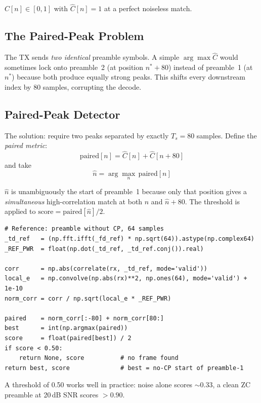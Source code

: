 \documentclass[11pt,a4paper]{article}
\begin{document}
$\hat{C}[n] \in [0,1]$ with $\hat{C}[n]=1$ at a perfect noiseless match.

\subsection{The Paired-Peak Problem}

The TX sends \emph{two identical} preamble symbols.  A simple $\arg\max
\hat{C}$ would sometimes lock onto preamble~2 (at position
$n^* + 80$) instead of preamble~1 (at $n^*$) because both produce equally
strong peaks.  This shifts every downstream index by 80 samples, corrupting
the decode.

\subsection{Paired-Peak Detector}

The solution: require two peaks separated by exactly $T_s = 80$ samples.
Define the \emph{paired metric}:
\begin{equation}
  \text{paired}[n] = \hat{C}[n] + \hat{C}[n + 80]
\end{equation}
and take
\begin{equation}
  \hat{n} = \arg\max_n\, \text{paired}[n]
\end{equation}

$\hat{n}$ is unambiguously the start of preamble~1 because only that position
gives a \emph{simultaneous} high-correlation match at both $\hat{n}$ and
$\hat{n}+80$.  The threshold is applied to
$\text{score} = \text{paired}[\hat{n}]/2$.

\begin{lstlisting}
# Reference: preamble without CP, 64 samples
_td_ref   = (np.fft.ifft(_fd_ref) * np.sqrt(64)).astype(np.complex64)
_REF_PWR  = float(np.dot(_td_ref, _td_ref.conj()).real)

corr      = np.abs(correlate(rx, _td_ref, mode='valid'))
local_e   = np.convolve(np.abs(rx)**2, np.ones(64), mode='valid') + 1e-10
norm_corr = corr / np.sqrt(local_e * _REF_PWR)

paired    = norm_corr[:-80] + norm_corr[80:]
best      = int(np.argmax(paired))
score     = float(paired[best]) / 2
if score < 0.50:
    return None, score          # no frame found
return best, score              # best = no-CP start of preamble-1
\end{lstlisting}

A threshold of 0.50 works well in practice: noise alone scores $\sim0.33$,
a clean ZC preamble at 20\,dB SNR scores $>0.90$.
\end{document}
